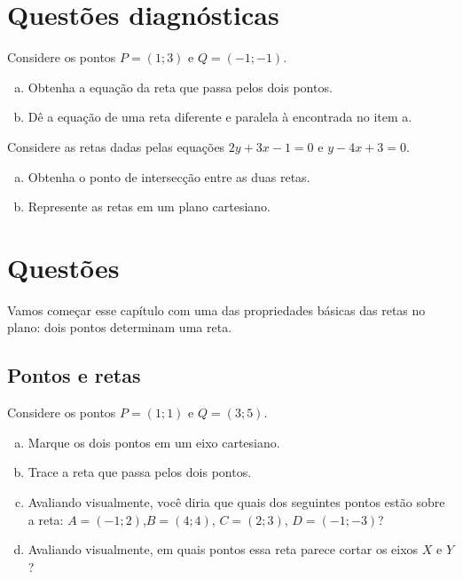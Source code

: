 \documentclass[main_estudante.tex]{subfiles}
\begin{document}
\newpage

\section{Questões diagnósticas}

\begin{diagnostico}
Considere os pontos $P=(1;3)$ e $Q=(-1;-1)$.
\begin{enumerate}[a)]
\item Obtenha a equação da reta que passa pelos dois pontos.
\item Dê a equação de uma reta diferente e paralela à encontrada no item a.
\end{enumerate}
\end{diagnostico}

\vspace{4cm}

\begin{diagnostico}
Considere as retas dadas pelas equações $2y+3x-1=0$ e $y-4x+3=0$.
\begin{enumerate}[a)]
\item Obtenha o ponto de intersecção entre as duas retas.
\item Represente as retas em um plano cartesiano.
\end{enumerate}
\end{diagnostico}

\newpage

\section{Questões}

Vamos começar esse capítulo com uma das propriedades básicas das retas no plano: dois pontos determinam uma reta.

\subsection*{Pontos e retas}

\begin{questao}
Considere os pontos $P=(1;1)$ e $Q=(3;5)$.
\begin{enumerate}[a)]
\item Marque os dois pontos em um eixo cartesiano.
\item Trace a reta que passa pelos dois pontos.
\item Avaliando visualmente, você diria que quais dos seguintes pontos estão sobre a reta: $A=(-1;2)$,$B=(4;4)$, $C=(2;3)$, $D=(-1;-3)$?
\item Avaliando visualmente, em quais pontos essa reta parece cortar os eixos $X$ e $Y$?
\end{enumerate}
\end{questao}
\end{document}
